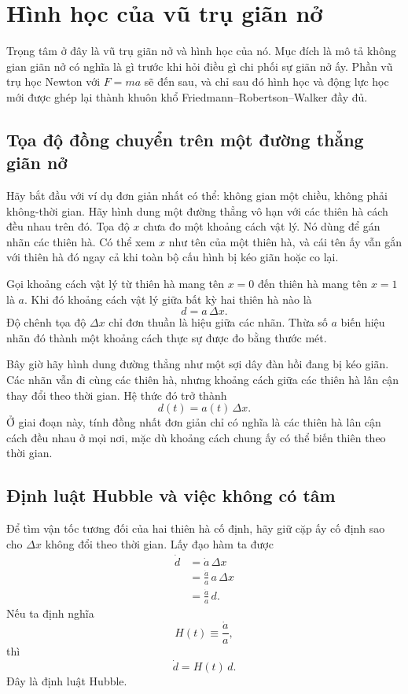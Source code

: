 \chapter{Hình học của vũ trụ giãn nở}

Trọng tâm ở đây là vũ trụ giãn nở và hình học của nó. Mục đích là mô tả không gian giãn nở có nghĩa là gì trước khi hỏi điều gì chi phối sự giãn nở ấy. Phần vũ trụ học Newton với \(F=ma\) sẽ đến sau, và chỉ sau đó hình học và động lực học mới được ghép lại thành khuôn khổ Friedmann--Robertson--Walker đầy đủ.

\section{Tọa độ đồng chuyển trên một đường thẳng giãn nở}

Hãy bắt đầu với ví dụ đơn giản nhất có thể: không gian một chiều, không phải không-thời gian. Hãy hình dung một đường thẳng vô hạn với các thiên hà cách đều nhau trên đó. Tọa độ \(x\) chưa đo một khoảng cách vật lý. Nó dùng để gán nhãn các thiên hà. Có thể xem \(x\) như tên của một thiên hà, và cái tên ấy vẫn gắn với thiên hà đó ngay cả khi toàn bộ cấu hình bị kéo giãn hoặc co lại.

Gọi khoảng cách vật lý từ thiên hà mang tên \(x=0\) đến thiên hà mang tên \(x=1\) là \(a\). Khi đó khoảng cách vật lý giữa bất kỳ hai thiên hà nào là
\begin{equation}
d=a\,\Delta x.
\end{equation}
Độ chênh tọa độ \(\Delta x\) chỉ đơn thuần là hiệu giữa các nhãn. Thừa số \(a\) biến hiệu nhãn đó thành một khoảng cách thực sự được đo bằng thước mét.

Bây giờ hãy hình dung đường thẳng như một sợi dây đàn hồi đang bị kéo giãn. Các nhãn vẫn đi cùng các thiên hà, nhưng khoảng cách giữa các thiên hà lân cận thay đổi theo thời gian. Hệ thức đó trở thành
\begin{equation}
d(t)=a(t)\,\Delta x.
\end{equation}
Ở giai đoạn này, tính đồng nhất đơn giản chỉ có nghĩa là các thiên hà lân cận cách đều nhau ở mọi nơi, mặc dù khoảng cách chung ấy có thể biến thiên theo thời gian.

\section{Định luật Hubble và việc không có tâm}

Để tìm vận tốc tương đối của hai thiên hà cố định, hãy giữ cặp ấy cố định sao cho \(\Delta x\) không đổi theo thời gian. Lấy đạo hàm ta được
\begin{align}
\dot d &= \dot a\,\Delta x \\
       &= \frac{\dot a}{a}\,a\,\Delta x \\
       &= \frac{\dot a}{a}\,d.
\end{align}
Nếu ta định nghĩa
\begin{equation}
H(t)\equiv \frac{\dot a}{a},
\end{equation}
thì
\begin{equation}
\dot d = H(t)\,d.
\end{equation}
Đây là định luật Hubble.

